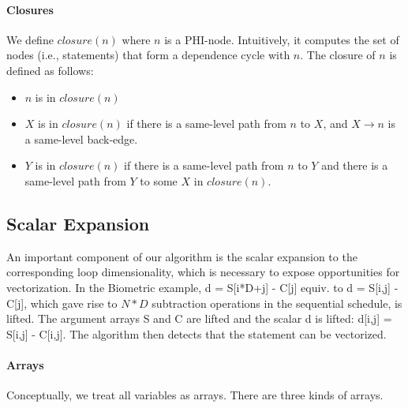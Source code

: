 \paragraph{Closures}
We define $\mathit{closure}(n)$ where $n$ is a PHI-node. Intuitively, it computes the set of nodes (i.e., statements) that form a dependence cycle with $n$. The closure of $n$ is defined as follows:
\begin{itemize}
\item $n$ is in $\mathit{closure}(n)$
\item $X$ is in $\mathit{closure}(n)$ if there is a same-level path from $n$ to $X$, and $X \rightarrow n$ is a same-level back-edge.
\item $Y$ is in $\mathit{closure}(n)$ if there is a same-level path from $n$ to $Y$ and there is a same-level path from $Y$ to some $X$ in $\mathit{closure}(n)$.
\end{itemize}

\subsection{Scalar Expansion}
\label{sec:expansion}


An important component of our algorithm is the scalar expansion to the corresponding loop dimensionality, 
which is necessary to expose opportunities for vectorization.
In the Biometric example, {\sf d = S[i*D+j] - C[j]} equiv. to {\sf d = S[i,j] - C[j]}, which gave rise to $N*D$ subtraction operations in the sequential schedule,
is lifted. The argument arrays {\sf S} and {\sf C} are lifted and the scalar {\sf d} is lifted: {\sf d[i,j] = S[i,j] - C[i,j]}.
The algorithm then detects that the statement can be vectorized.

\paragraph{Arrays} Conceptually, we treat all variables as arrays. There are three kinds of arrays. 

